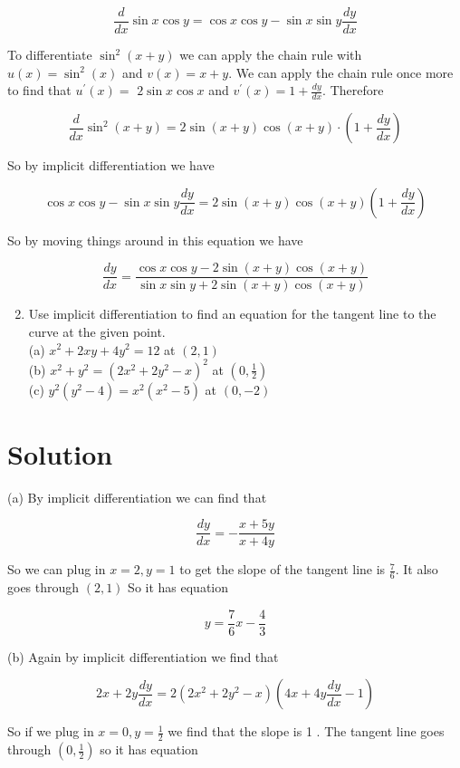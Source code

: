 \documentclass[10pt]{article}
\begin{document}
$$
\frac{d}{d x} \sin x \cos y=\cos x \cos y-\sin x \sin y \frac{d y}{d x}
$$

To differentiate $\sin ^{2}(x+y)$ we can apply the chain rule with $u(x)=\sin ^{2}(x)$ and $v(x)=x+y$. We can apply the chain rule once more to find that $u^{\prime}(x)=$ $2 \sin x \cos x$ and $v^{\prime}(x)=1+\frac{d y}{d x}$. Therefore

$$
\frac{d}{d x} \sin ^{2}(x+y)=2 \sin (x+y) \cos (x+y) \cdot\left(1+\frac{d y}{d x}\right)
$$

So by implicit differentiation we have

$$
\cos x \cos y-\sin x \sin y \frac{d y}{d x}=2 \sin (x+y) \cos (x+y)\left(1+\frac{d y}{d x}\right)
$$

So by moving things around in this equation we have

$$
\frac{d y}{d x}=\frac{\cos x \cos y-2 \sin (x+y) \cos (x+y)}{\sin x \sin y+2 \sin (x+y) \cos (x+y)}
$$

\begin{enumerate}
  \setcounter{enumi}{1}
  \item Use implicit differentiation to find an equation for the tangent line to the curve at the given point.\\
(a) $x^{2}+2 x y+4 y^{2}=12$ at $(2,1)$\\
(b) $x^{2}+y^{2}=\left(2 x^{2}+2 y^{2}-x\right)^{2}$ at $\left(0, \frac{1}{2}\right)$\\
(c) $y^{2}\left(y^{2}-4\right)=x^{2}\left(x^{2}-5\right)$ at $(0,-2)$
\end{enumerate}

\section*{Solution}
(a) By implicit differentiation we can find that

$$
\frac{d y}{d x}=-\frac{x+5 y}{x+4 y}
$$

So we can plug in $x=2, y=1$ to get the slope of the tangent line is $\frac{7}{6}$. It also goes through $(2,1)$ So it has equation

$$
y=\frac{7}{6} x-\frac{4}{3}
$$

(b) Again by implicit differentiation we find that

$$
2 x+2 y \frac{d y}{d x}=2\left(2 x^{2}+2 y^{2}-x\right)\left(4 x+4 y \frac{d y}{d x}-1\right)
$$

So if we plug in $x=0, y=\frac{1}{2}$ we find that the slope is 1 . The tangent line goes through $\left(0, \frac{1}{2}\right)$ so it has equation
\end{document}
